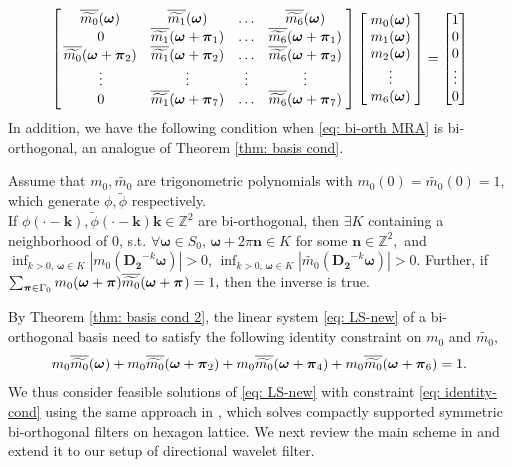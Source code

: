\begin{align}\label{eq: LS-new}
\begin{bmatrix}
    \,\overline{\widetilde{m_{0}}}(\boldsymbol{\omega}) & \overline{\widetilde{m_{1}}}(\boldsymbol{\omega}) & \hdots & \overline{\widetilde{m_{6}}}(\boldsymbol{\omega})\;  \\
    \;0 & \overline{\widetilde{m_{1}}}(\boldsymbol{\omega} + \boldsymbol{\pi}_{1})  & \hdots  & \overline{\widetilde{m_{6}}}(\boldsymbol{\omega} + \boldsymbol{\pi}_{1})\; \\
    \,\overline{\widetilde{m_{0}}}(\boldsymbol{\omega} + \boldsymbol{\pi}_{2}) & \overline{\widetilde{m_{1}}}(\boldsymbol{\omega} + \boldsymbol{\pi}_{2}) & \hdots & \overline{\widetilde{m_{6}}}(\boldsymbol{\omega} + \boldsymbol{\pi}_{2})\;\\
    \;\vdots & \vdots & \vdots & \vdots \; \\
    \;0 & \overline{\widetilde{m_{1}}}(\boldsymbol{\omega} + \boldsymbol{\pi}_{7}) & \hdots & \overline{\widetilde{m_{6}}}(\boldsymbol{\omega} + \boldsymbol{\pi}_{7})\;
\end{bmatrix}
\begin{bmatrix}
\;m_{0}(\boldsymbol{\omega})\; \\
\;m_{1}(\boldsymbol{\omega})\; \\
\;m_{2}(\boldsymbol{\omega})\; \\
\; \vdots\; \\
\;m_{6}(\boldsymbol{\omega})\; 
\end{bmatrix} 
=
\begin{bmatrix}
1\\
0\\
0\\
\vdots \\
0
\end{bmatrix}
\end{align}
In addition, we have the following condition when \eqref{eq: bi-orth MRA} is bi-orthogonal, an analogue of Theorem \ref{thm: basis cond}.
\begin{thm}\label{thm: basis cond 2}
Assume that $m_0, \widetilde{m_0}$ are trigonometric polynomials with $m_0(0)=\widetilde{m_0}(0) = 1$, which generate $\phi,\widetilde{\phi}$ respectively.\\
If $\phi(\cdot - \boldsymbol{k}),\widetilde{\phi}(\cdot - \boldsymbol{k})\boldsymbol{k}\in\mathbb{Z}^2$ are bi-orthogonal, then $\exists K$ containing a neighborhood of 0, s.t. $\forall\boldsymbol{\omega}\in S_0,\,\boldsymbol{\omega}+2\pi\mathbf{n}\in K$ for some $\mathbf{n}\in\mathbb{Z}^2, $ and $\inf_{k>0,\,\boldsymbol{\omega}\in K}|m_0(\mathbf{D_2}^{-k}\boldsymbol{\omega})| >0$, $\inf_{k>0,\,\boldsymbol{\omega}\in K}|\widetilde{m_0}(\mathbf{D_2}^{-k}\boldsymbol{\omega})| >0$. 
 Further, if  $\sum_{\boldsymbol{\boldsymbol{\pi}}\in \Gamma_0} m_0(\boldsymbol{\omega}+\boldsymbol{\pi})\overline{\widetilde{m_{0}}}(\boldsymbol{\omega} + \boldsymbol{\pi}_{}) = 1,$ then the inverse is true.
\end{thm}
By Theorem \ref{thm: basis cond 2}, the linear system \eqref{eq: LS-new} of a bi-orthogonal basis need to satisfy the following identity constraint on $m_0$ and $\widetilde{m_0}$,
\begin{align}\label{eq: identity-cond}
m_0\overline{\widetilde{m_{0}}}(\boldsymbol{\omega}) + m_0\overline{\widetilde{m_{0}}}(\boldsymbol{\omega} + \boldsymbol{\pi}_{2}) + m_0\overline{\widetilde{m_{0}}}(\boldsymbol{\omega} + \boldsymbol{\pi}_{4}) + m_0\overline{\widetilde{m_{0}}}(\boldsymbol{\omega} + \boldsymbol{\pi}_{6}) = 1.
\end{align}
We thus consider feasible solutions of \eqref{eq: LS-new} with constraint \eqref{eq: identity-cond} using the same approach in \cite{cohen1993compactly}, which solves compactly supported symmetric bi-orthogonal filters on hexagon lattice. We next review the main scheme in \cite{cohen1993compactly} and extend it to our setup of directional wavelet filter.

